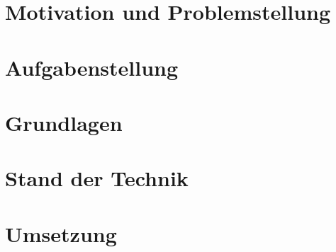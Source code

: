 \documentclass[
	ngerman,
	a4paper,
	twoside
]{scrbook}
\begin{document}
\chapter{Motivation und Problemstellung}	

	
	
\chapter{Aufgabenstellung}



\chapter{Grundlagen}



\chapter{Stand der Technik}



\chapter{Umsetzung}













	\printbibliography
\end{document}
